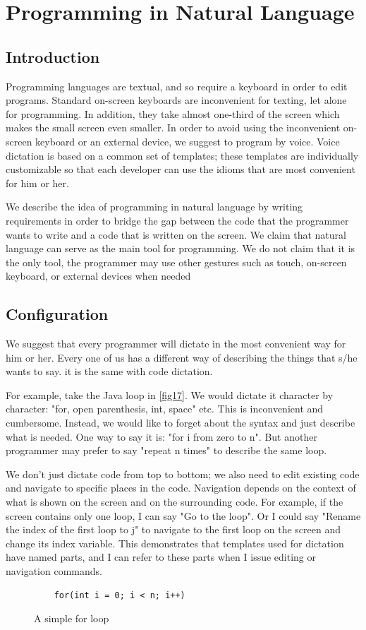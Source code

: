 \chapter{Programming in Natural Language} \label{chapter: Programming in Natural Language}
\section{Introduction}
Programming languages are textual, and so require a keyboard in order to edit programs. Standard on-screen keyboards are inconvenient for texting, let alone for programming. In addition, they take almost one-third of the screen which makes the small screen even smaller. In order to avoid using the inconvenient on-screen keyboard or an external device, we suggest to program by voice. Voice dictation is based on a common set of templates; these templates are individually customizable so that each developer can use the idioms that are most convenient for him or her.

We describe the idea of programming in natural language by writing requirements in order to bridge the gap between the code that the programmer wants to write and a code that is written on the screen. We claim that natural language can serve as the main tool for programming. We do not claim that it is the only tool, the programmer may use other gestures such as touch, on-screen keyboard, or external devices when needed 
\section{Configuration}
We suggest that every programmer will dictate in the most convenient way for him or her. Every one of us has a different way of describing the things that s/he wants to say. it is the same with code dictation.

For example, take the Java loop in \autoref{fig17}. We would dictate it character by character: "for, open parenthesis, int, space" etc. This is inconvenient and cumbersome. Instead, we would like to forget about the syntax and just describe what is needed. One way to say it is: "for i from zero to n". But another programmer may prefer to say "repeat n times" to describe the same loop.

We don't just dictate code from top to bottom; we also need to edit existing code and navigate to specific places in the code. Navigation depends on the context of what is shown on the screen and on the surrounding code. For example, if the screen contains only one loop, I can say "Go to the loop". Or I could say "Rename the index of the first loop to j" to navigate to the first loop on the screen and change its index variable. This demonstrates that templates used for dictation have named parts, and I can refer to these parts when I issue editing or navigation commands.
\begin{figure}[H]
	\begin{lstlisting}
	for(int i = 0; i < n; i++)
	\end{lstlisting}
	\caption{A simple for loop}
	\label{fig17}
\end{figure}
